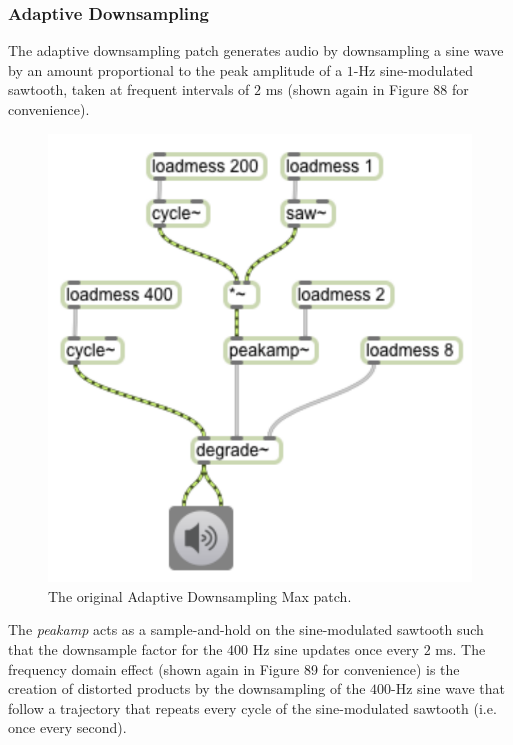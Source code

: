\documentclass[12pt]{report} 	%
\numberwithin{figure}{chapter}
\numberwithin{table}{chapter}
\numberwithin{equation}{chapter}
\begin{document}
\begin{flushleft}
\subsubsection{Adaptive Downsampling}
The adaptive downsampling patch generates audio by downsampling a sine wave by an amount proportional to the peak amplitude of a $1$-Hz sine-modulated sawtooth, taken at frequent intervals of $2$ ms (shown again in Figure 88 for convenience).
\begin{figure}[h!]
\begin{center}
\includegraphics[scale=0.8]{AdaptiveDegrade}
\caption[Original adaptive downsampling Max patch]{The original Adaptive Downsampling Max patch.}
\end{center}
\end{figure}
The \textit{peakamp\texttildelow{}} acts as a sample-and-hold on the sine-modulated sawtooth such that the downsample factor for the $400$ Hz sine updates once every $2$ ms. The frequency domain effect (shown again in Figure 89 for convenience) is the creation of distorted products by the downsampling of the $400$-Hz sine wave that follow a trajectory that repeats every cycle of the sine-modulated sawtooth (i.e. once every second).
\begin{figure}[h!]
\begin{center}

\end{center}
\end{figure}
\end{flushleft}
\end{document}
